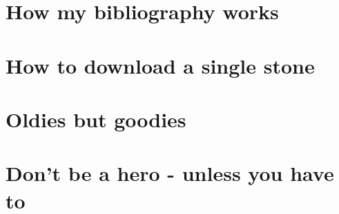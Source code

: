 \section{How my bibliography works}  %
\section{How to download a single stone}  %
\section{Oldies but goodies}  %
\section{Don't be a hero - unless you have to}  %

